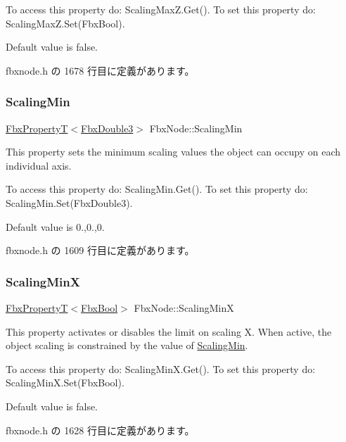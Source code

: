 To access this property do\+: Scaling\+Max\+Z.\+Get(). To set this property do\+: Scaling\+Max\+Z.\+Set(\+Fbx\+Bool).

Default value is false. 

 fbxnode.\+h の 1678 行目に定義があります。

\mbox{\label{class_fbx_node_a90124619387dc0d2f078d4301cffb4d9}} 
\subsubsection{\texorpdfstring{Scaling\+Min}{ScalingMin}}
{\footnotesize\ttfamily \hyperlink{class_fbx_property_t}{Fbx\+PropertyT}$<$\hyperlink{fbxtypes_8h_ae0a96f14cde566774c7553aa7523b7a7}{Fbx\+Double3}$>$ Fbx\+Node\+::\+Scaling\+Min}

This property sets the minimum scaling values the object can occupy on each individual axis.

To access this property do\+: Scaling\+Min.\+Get(). To set this property do\+: Scaling\+Min.\+Set(\+Fbx\+Double3).

Default value is 0.,0.,0. 

 fbxnode.\+h の 1609 行目に定義があります。

\mbox{\label{class_fbx_node_ad47427b4a9e01ab8e08a0a589a0f1c43}} 
\subsubsection{\texorpdfstring{Scaling\+MinX}{ScalingMinX}}
{\footnotesize\ttfamily \hyperlink{class_fbx_property_t}{Fbx\+PropertyT}$<$\hyperlink{fbxtypes_8h_a92e0562b2fe33e76a242f498b362262e}{Fbx\+Bool}$>$ Fbx\+Node\+::\+Scaling\+MinX}

This property activates or disables the limit on scaling X. When active, the object scaling is constrained by the value of \hyperlink{class_fbx_node_a90124619387dc0d2f078d4301cffb4d9}{Scaling\+Min}.

To access this property do\+: Scaling\+Min\+X.\+Get(). To set this property do\+: Scaling\+Min\+X.\+Set(\+Fbx\+Bool).

Default value is false. 

 fbxnode.\+h の 1628 行目に定義があります。

